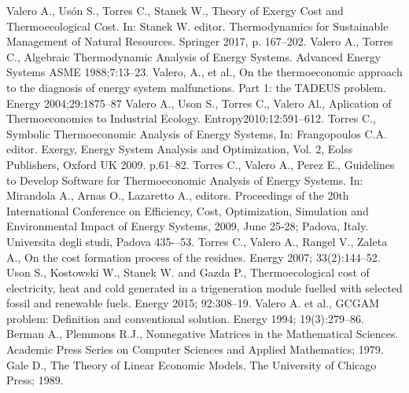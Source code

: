 \documentclass{ecos2018}
\begin{document}
\begin{thebibliography}{11}
\setlength{\itemsep}{0pt}
\setlength{\parsep}{0pt}
Valero A., Usón S., Torres C., Stanek W., Theory of Exergy Cost and Thermoecological Cost.
In: Stanek W. editor. Thermodynamics for Sustainable Management of Natural Resources. Springer 2017, p. 167--202.
Valero A., Torres C., Algebraic Thermodynamic Analysis of Energy Systems. Advanced Energy Systems ASME 1988;7:13--23.
Valero, A., et al.,
On the thermoeconomic approach to the diagnosis of energy system malfunctions. Part 1: the TADEUS problem.
Energy 2004;29:1875--87
Valero A., Uson S., Torres C., Valero Al., Aplication of Thermoeconomics to Industrial Ecology.
Entropy2010;12:591--612.
Torres C.,
Symbolic Thermoeconomic Analysis of Energy Systems,
In: Frangopoulos C.A. editor. Exergy, Energy System Analysis and Optimization, Vol. 2,
Eolss Publishers, Oxford UK 2009. p.61--82.
Torres C., Valero A., Perez E., Guidelines to Develop Software for Thermoeconomic Analysis of Energy Systems.
In: Mirandola A., Arnas O., Lazaretto A., editors.
Proceedings of the 20th International Conference on Efficiency, Cost, Optimization, Simulation and Environmental Impact of Energy Systems, 2009, June 25-28; Padova, Italy.
Universita degli studi, Padova 435-–53.
Torres C., Valero A., Rangel V., Zaleta A.,
On the cost formation process of the residues.
Energy 2007; 33(2):144--52.
Uson S., Kostowski W., Stanek W. and Gazda P.,
Thermoecological cost of electricity, heat and cold generated in a trigeneration module fuelled with selected fossil and renewable fuels.
Energy 2015; 92:308--19.
Valero A. et al.,
GCGAM problem: Definition and conventional solution.
Energy 1994; 19(3):279--86.
Berman A., Plemmons R.J., Nonnegative Matrices in the Mathematical Sciences. Academic Press Series on Computer Sciences and Applied Mathematics; 1979.
Gale D., The Theory of Linear Economic Models. The University of Chicago Press; 1989.
\end{thebibliography}
\end{document}
